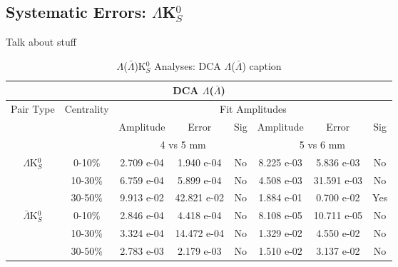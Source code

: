 \documentclass[../AnalysisNoteJBuxton.tex]{subfiles}
\begin{document}
\subsection{Systematic Errors: \texorpdfstring{$\Lambda$K$^{0}_{S}$}{TEXT}}
\label{SysErrsLamK0}

Talk about stuff

\begin{table}
 \centering
 \begin{tabular}{|c|c|c|c|c||c|c|c|}
  \multicolumn{8}{c}{DCA $\Lambda$($\bar{\Lambda}$)} \\
  \hline
  \multirow{3}{*}{Pair Type} & \multirow{3}{*}{Centrality} & \multicolumn{6}{c|}{Fit Amplitudes} \\
  \cline{3-8}
   & & Amplitude & Error & Sig & Amplitude & Error & Sig \\
  \cline{3-8}
   & & \multicolumn{3}{c||}{4 vs 5 mm} & \multicolumn{3}{c|}{5 vs 6 mm} \\
  \hline  
  \multirow{3}{*}{$\Lambda$K$^{0}_{S}$}  
   &  0-10\% & 2.709 e-04 & 1.940 e-04 & No & 8.225 e-03 & 5.836 e-03 & No \\
   & 10-30\% & 6.759 e-04 & 5.899 e-04 & No & 4.508 e-03 & 31.591 e-03 & No \\
   & 30-50\% & 9.913 e-02 & 42.821 e-02 & No & 1.884 e-01 & 0.700 e-02 & Yes\\
  \hline  
  \multirow{3}{*}{$\bar{\Lambda}$K$^{0}_{S}$}  
   &  0-10\% & 2.846 e-04 & 4.418 e-04 & No & 8.108 e-05 & 10.711 e-05 & No \\
   & 10-30\% & 3.324 e-04 & 14.472 e-04 & No & 1.329 e-02 & 4.550 e-02 & No \\
   & 30-50\% & 2.783 e-03 & 2.179 e-03 & No & 1.510 e-02 & 3.137 e-02 & No \\ 
  \hline
 \end{tabular}
 \caption{$\Lambda$($\bar{\Lambda}$)K$^{0}_{S}$ Analyses: DCA $\Lambda$($\bar{\Lambda}$) caption}
 \label{tab:LamDcaLamK0}
\end{table}
\end{document}
